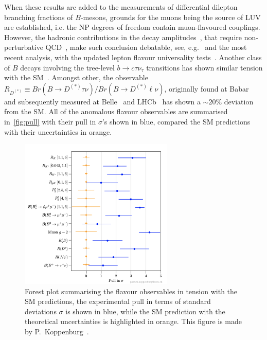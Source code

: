 \par When these results are added to the measurements of differential dilepton branching fractions of $B$-mesons,  grounds for the muons being the source of LUV are established, i.e. the NP degrees of freedom contain muon-flavoured couplings.  However, the hadronic contributions in the decay amplitudes~\cite{Khodjamirian:2010vf,Lyon:2014hpa,Chobanova:2017ghn,Blake:2017fyh,Bobeth:2017vxj}, that require non-perturbative QCD~\cite{Jager:2014rwa,Ciuchini:2015qxb,Arbey:2018ics,Chrzaszcz:2018yza}, make such conclusion debatable, see, e.g.~\cite{Ciuchini:2018anp,Hurth:2020rzx} and the most recent analysis, with the updated lepton flavour universality tests~\cite{Ciuchini:2021smi}. 
Another class of $B$ decays involving the tree-level $ b \to c \tau \nu_\tau$ transitions has shown similar tension with the SM~\cite{Azatov:2018knx,Alok:2019uqc,Murgui:2019czp,Shi:2019gxi}. Amongst other, the observable $R_{D^{(*)}} \equiv Br(B \to D^{(*)} \tau \nu) / Br(B \to D^{(*)} \ell \nu)$, originally found at Babar~\cite{Lees:2013uzd} and subsequently measured at Belle~\cite{Huschle:2015rga} and LHCb~\cite{Aaij:2017uff} has shown a $\sim 20\%$ deviation from the SM. All of the anomalous flavour observables are summarised in~\autoref{fig:pull} with their pull in $\sigma$'s shown in blue, compared the SM predictions with their uncertainties in orange. 
\begin{figure}[ht!]
	\centering
	\includegraphics[width=0.65\textwidth]{fig/pull}
	\caption{ Forest plot summarising the flavour observables in tension with the SM predictions, the experimental pull in terms of standard deviations $\sigma$ is shown in blue, while the SM prediction with the theoretical uncertainties is highlighted in orange. This figure is made by P.~Koppenburg~\cite{Koppenburg:2767155}. }
	\label{fig:pull}
\end{figure}
